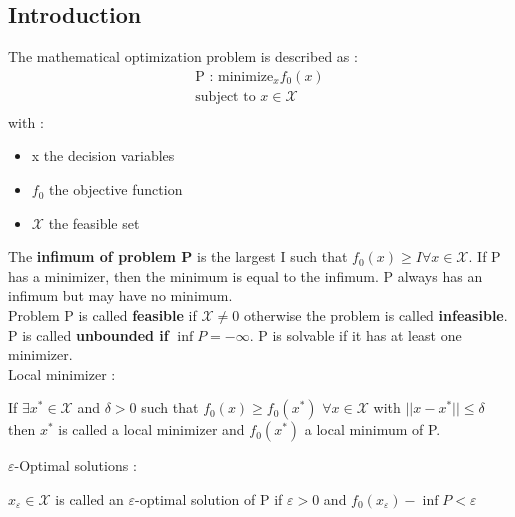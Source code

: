 \documentclass[../main.tex]{subfiles}
\begin{document}
\localtableofcontents

\subsection{Introduction}
The mathematical optimization problem is described as : \begin{equation}
\begin{gathered}
    \text{P : minimize}_x f_0(x)\\
    \text{subject to } x\in \mathcal{X}\\
\end{gathered}
\end{equation}
with : \begin{itemize}
    \item x the decision variables\\
    \item $f_0$ the objective function \\
    \item $\mathcal{X}$ the feasible set\\
\end{itemize}

The \textbf{infimum of problem P} is the largest I such that $f_0(x) \geq I \forall x \in \mathcal{X}$. If P has a minimizer, then the minimum is equal to the infimum. P always has an infimum but may have no minimum. \\

Problem P is called \textbf{feasible} if $\mathcal{X} \neq 0$ otherwise the problem is called \textbf{infeasible}. P is called \textbf{unbounded if} $\inf P = -\infty$. P is solvable if it has at least one minimizer.\\

Local minimizer : \\
\begin{theorem}
    If $\exists x^* \in \mathcal{X}$ and $\delta>0$ such that $f_0(x) \geq f_0(x^*)$ $\forall x \in \mathcal{X}$ with $\lvert \lvert x - x^* \rvert \rvert \leq \delta$ then $x^*$ is called a local minimizer and $f_0(x^*)$ a local minimum of P.
\end{theorem}

$\varepsilon$-Optimal solutions : \\
\begin{theorem}
    $x_\varepsilon \in \mathcal{X}$ is called an $\varepsilon$-optimal solution of P if $\varepsilon > 0$ and $f_0(x_\varepsilon) - \inf P < \varepsilon$
\end{theorem}
\end{document}
